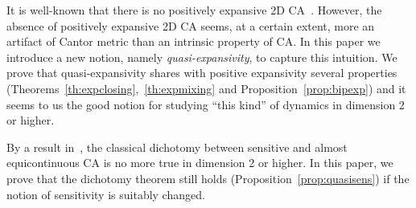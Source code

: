 \documentclass{llncs}
\newcommand{\ignore}[1]{}
\begin{document}
It is well-known that there is no positively expansive 2D CA~\cite{shereshevsky93}.\ignore{
 This result can be restated in terms of defects propagation. Indeed, in dimension 1, given a pair of distinct configurations $x,y$, call defects differences between $x$ and $y$.
Any expansive CA create and propagates defects in both directions (left and right) at each time step. In this way, at some later time $t$, $F^t(x)$ and $F^t(y)$ will differ in a cell near the
origin (how much near is determined by the expansivity constant).
The same behavior is not possible in dimension 2. The point is that
for any precision $\epsilon>0$, the exists a pair of configurations 
for which defects propagate in the 2D space avoiding the 
square $[-n,n]^2$ centered in the origin ($n$ is such that
$n$ is the least integer such that $2^{-n}<\epsilon$).
However, computer experiments show that there are many 2D CA which are able to create new defects and propagate them at each 
time step although this phenomenon is not enough to provide expansive behavior. In some sense these CA ``seem'' expansive and the fact that they are not appears to be more an artifact of the Cantor metric than an intrinsic property of the automaton.}
However, the absence of positively expansive 2D CA seems, at a certain extent,
more an artifact of Cantor metric than an intrinsic property of CA.
In this paper we introduce a new notion, namely \emph{quasi-expansivity}, to capture this intuition. We prove that quasi-expansivity shares with positive expansivity several properties (Theorems~\ref{th:expclosing},~\ref{th:expmixing} and Proposition~\ref{prop:bipexp}) and it seems to us the good notion for studying ``this kind'' of dynamics in dimension 2 or higher. 

By a result in~\cite{theyssier08}, the classical dichotomy between sensitive and almost equicontinuous CA is no more true in dimension 2 or higher. In this paper, we prove that the dichotomy theorem still holds (Proposition~\ref{prop:quasisens}) if
the notion of sensitivity is suitably changed. 
\end{document}
